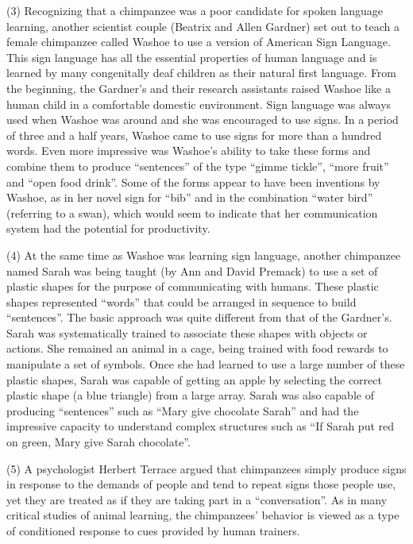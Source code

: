 \documentclass[UTF8,11pt]{ctexart}
\begin{document}
(3) Recognizing that a chimpanzee was a poor candidate for spoken language learning, another scientist couple (Beatrix and Allen Gardner) set out to teach a female chimpanzee called Washoe to use a version of American Sign Language. This sign language has all the essential properties of human language and is learned by many congenitally deaf children as their natural first language. From the beginning, the Gardner’s and their research assistants raised Washoe like a human child in a comfortable domestic environment. Sign language was always used when Washoe was around and she was encouraged to use signs. In a period of three and a half years, Washoe came to use signs for more than a hundred words. Even more impressive was Washoe’s ability to take these forms and combine them to produce “sentences” of the type “gimme tickle”, “more fruit” and “open food drink”. Some of the forms appear to have been inventions by Washoe, as in her novel sign for “bib” and in the combination “water bird” (referring to a swan), which would seem to indicate that her communication system had the potential for productivity.


(4) At the same time as Washoe was learning sign language, another chimpanzee named Sarah was being taught (by Ann and David Premack) to use a set of plastic shapes for the purpose of communicating with humans. These plastic shapes represented “words” that could be arranged in sequence to build “sentences”. The basic approach was quite different from that of the Gardner’s. Sarah was systematically trained to associate these shapes with objects or actions. She remained an animal in a cage, being trained with food rewards to manipulate a set of symbols. Once she had learned to use a large number of these plastic shapes, Sarah was capable of getting an apple by selecting the correct plastic shape (a blue triangle) from a large array. Sarah was also capable of producing “sentences” such as “Mary give chocolate Sarah” and had the impressive capacity to understand complex structures such as “If Sarah put red on green, Mary give Sarah chocolate”.


(5) A psychologist Herbert Terrace argued that chimpanzees simply produce signs in response to the demands of people and tend to repeat signs those people use, yet they are treated as if they are taking part in a “conversation”. As in many critical studies of animal learning, the chimpanzees’ behavior is viewed as a type of conditioned response to cues provided by human trainers.
\end{document}
